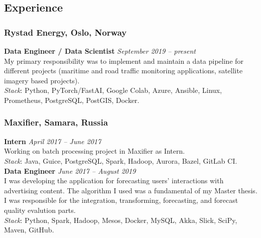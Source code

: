 \subsection*{Experience}
    \subsubsection*{Rystad Energy, Oslo, Norway}
    \textbf{Data Engineer / Data Scientist} \hfill \textit{September 2019 -- present} \\
    My primary responsibility was to implement and maintain a data pipeline for different projects 
    (maritime and road traffic monitoring applications, satellite imagery based projects). \\
    \textit{Stack}: Python, PyTorch/FastAI, Google Colab, Azure, Ansible, Linux, Prometheus, PostgreSQL, PostGIS, Docker.
    \subsubsection*{Maxifier, Samara, Russia}
    \textbf{Intern} \hfill \textit{April 2017 -- June 2017} \\
    Working on batch processing project in Maxifier as Intern. \\
    \textit{Stack}: Java, Guice, PostgreSQL, Spark, Hadoop, Aurora, Bazel, GitLab CI. \\
    \textbf{Data Engineer} \hfill \textit{June 2017 -- August 2019} \\
    I was developing the application for forecasting users' interactions with advertising content.
    The algorithm I used was a fundamental of my Master thesis.
    I was responsible for the integration, transforming, forecasting, and forecast quality evalution parts.  \\
    \textit{Stack}: Python, Spark, Hadoop, Mesos, Docker, MySQL, Akka, Slick, SciPy, Maven, GitHub.
